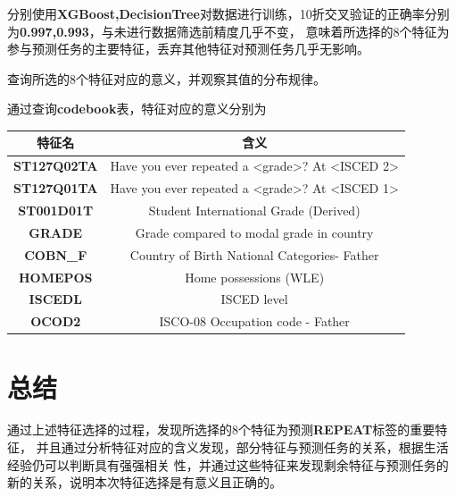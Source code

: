 \documentclass[12pt, a4paper, oneside]{ctexart}
\begin{document}
分别使用\textbf{XGBoost,DecisionTree}对数据进行训练，10折交叉验证的正确率分别为\textbf{0.997,0.993}，与未进行数据筛选前精度几乎不变，
意味着所选择的8个特征为参与预测任务的主要特征，丢弃其他特征对预测任务几乎无影响。

查询所选的8个特征对应的意义，并观察其值的分布规律。

通过查询\textbf{codebook}表，特征对应的意义分别为
\begin{table}[t]
    \centering%
    \begin{tabular}{cc}%
    \toprule%
    特征名&含义 \\
    \midrule%
    \textbf{ST127Q02TA} &Have you ever repeated a <grade>? At <ISCED 2>\\
    \textbf{ST127Q01TA} &Have you ever repeated a <grade>? At <ISCED 1>\\
    \textbf{ST001D01T} &Student International Grade (Derived)\\
    \textbf{GRADE} & Grade compared to modal grade in country\\
    \textbf{COBN\_F} &Country of Birth National Categories- Father\\
    \textbf{HOMEPOS} &Home possessions (WLE)\\
    \textbf{ISCEDL} & ISCED level\\
    \textbf{OCOD2} & ISCO-08 Occupation code - Father\\

    \bottomrule%
    \end{tabular}
\end{table}
\section{总结}
通过上述特征选择的过程，发现所选择的8个特征为预测\textbf{REPEAT}标签的重要特征，
并且通过分析特征对应的含义发现，部分特征与预测任务的关系，根据生活经验仍可以判断具有强强相关
性，并通过这些特征来发现剩余特征与预测任务的新的关系，说明本次特征选择是有意义且正确的。
\end{document}
